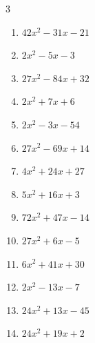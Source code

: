 \begin{multicols}{3}
\begin{enumerate}
        \phantom{$=(3x-1)(9x+8)$}

  \item $42x^{2}-31x-21$

        \phantom{$=(7x+3)(6x-7)$}

  \item $2x^{2}-5x-3$

        \phantom{$=(2x+1)(x-3)$}

  \item $27x^{2}-84x+32$

        \phantom{$=(9x-4)(3x-8)$}

  \item $2x^{2}+7x+6$

        \phantom{$=(x+2)(2x+3)$}

  \item $2x^{2}-3x-54$

        \phantom{$=(2x+9)(x-6)$}

  \item $27x^{2}-69x+14$

        \phantom{$=(9x-2)(3x-7)$}

  \item $4x^{2}+24x+27$

        \phantom{$=(2x+9)(2x+3)$}

  \item $5x^{2}+16x+3$

        \phantom{$=(x+3)(5x+1)$}

\columnbreak %

\resetques

  \item $72x^{2}+47x-14$

        \phantom{$=(9x-2)(8x+7)$}

  \item $27x^{2}+6x-5$

        \phantom{$=(3x-1)(9x+5)$}

  \item $6x^{2}+41x+30$

        \phantom{$=(6x+5)(x+6)$}

  \item $2x^{2}-13x-7$

        \phantom{$=(2x+1)(x-7)$}

  \item $24x^{2}+13x-45$

        \phantom{$=(8x-9)(3x+5)$}

  \item $24x^{2}+19x+2$


\end{enumerate}
\end{multicols}
